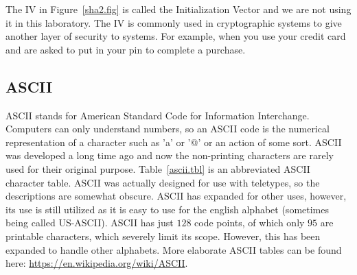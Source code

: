 \documentclass{article}
\begin{document}
The IV in Figure~\ref{sha2.fig} is called the Initialization Vector
and we are not using it in this laboratory.  The IV is commonly
used in cryptographic systems to give another layer of security to
systems.  For example, when
you use your credit card and are asked to put in your pin to complete a purchase.

\subsection{ASCII}

ASCII stands for American Standard Code for Information
Interchange. Computers can only understand numbers, so an ASCII code
is the numerical representation of a character such as 'a' or '@' or
an action of some sort. ASCII was developed a long time ago and now
the non-printing characters are rarely used for their original
purpose. Table~\ref{ascii.tbl} is an abbreviated
ASCII character table. ASCII was
actually designed for use with teletypes, so the descriptions are
somewhat obscure.
ASCII has expanded for other uses, however, its use is still
utilized as it is easy to use for the english alphabet (sometimes being
called US-ASCII).
ASCII has just $128$ code points, of which only $95$ are printable
characters, which severely limit its scope.  However, this has been
expanded to handle other alphabets.  More elaborate ASCII tables can
be found here: \url{https://en.wikipedia.org/wiki/ASCII}.
\end{document}

